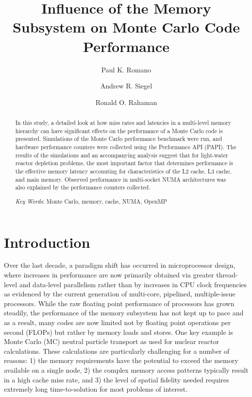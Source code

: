 \documentclass{mc2015}
\begin{document}
\title{Influence of the Memory Subsystem on Monte Carlo Code Performance}

\author{Paul K. Romano}

\author{Andrew R. Siegel}
\author{Ronald O. Rahaman}

\maketitle

\begin{abstract}
In this study, a detailed look at how miss rates and latencies in a multi-level
memory hierarchy can have significant effects on the performance of a Monte
Carlo code is presented. Simulations of the Monte Carlo performance benchmark
were run, and hardware performance counters were collected using the
Performance API (PAPI). The results of the simulations and an accompanying
analysis suggest that for light-water reactor depletion problems, the most
important factor that determines performance is the effective memory latency
accounting for characteristics of the L2 cache, L3 cache, and main
memory. Observed performance in multi-socket NUMA architectures was also
explained by the performance counters collected.

\emph{Key Words}: Monte Carlo, memory, cache, NUMA, OpenMP
\end{abstract}

\section{Introduction}

Over the last decade, a paradigm shift has occurred in microprocessor design,
where increases in performance are now primarily obtained via greater
thread-level and data-level parallelism rather than by increases in CPU clock
frequencies as evidenced by the current generation of multi-core, pipelined,
multiple-issue processors. While the raw floating point performance of
processors has grown steadily, the performance of the memory subsystem has not
kept up to pace and as a result, many codes are now limited not by floating
point operations per second (FLOPs) but rather by memory loads and stores. One
key example is Monte Carlo (MC) neutral particle transport as used for nuclear
reactor calculations. These calculations are particularly challenging for a
number of reasons: 1) the memory requirements have the potential to exceed the
memory available on a single node, 2) the complex memory access patterns
typically result in a high cache miss rate, and 3) the level of spatial fidelity
needed requires extremely long time-to-solution for most problems of interest.
\end{document}
